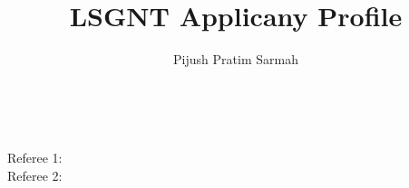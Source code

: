 \documentclass[12pt,a4paper]{article}
\title{LSGNT Applicany Profile}
\date{}
\author{Pijush Pratim Sarmah}
\makeatletter
\renewcommand{\maketitle}{\bgroup\setlength{\parindent}{0pt}
	\begin{center}
		{\Huge\textbf{\textcolor{NavyBlue}{\@title}}}
		\\
		{\Large\textbf{\@author}}
	\end{center}\egroup
}
\makeatother
\begin{document}
\maketitle
\vspace{1cm}
\begin{description}
	\item[Referee 1:] 
	\item[Referee 2:] 
\end{description}
\end{document}
